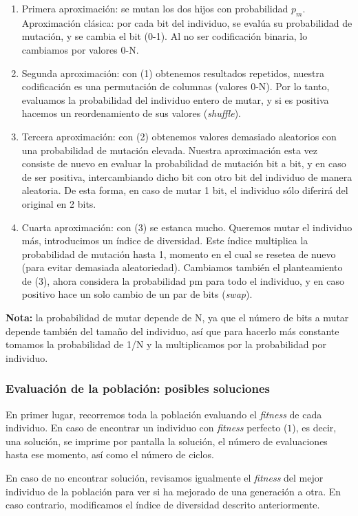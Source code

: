 \documentclass[12pt]{article}
\begin{document}
\begin{enumerate}
    \item Primera aproximación: se mutan los dos hijos con probabilidad $p_m$. Aproximación clásica: por cada bit del individuo, se evalúa su probabilidad de mutación, y se cambia el bit (0-1). Al no ser codificación binaria, lo cambiamos por valores 0-N.
    \item Segunda aproximación: con (1) obtenemos resultados repetidos, nuestra codificación es una permutación de columnas (valores 0-N). Por lo tanto, evaluamos la probabilidad del individuo entero de mutar, y si es positiva hacemos un reordenamiento de sus valores (\emph{shuffle}).
    \item Tercera aproximación: con (2) obtenemos valores demasiado aleatorios con una probabilidad de mutación elevada. Nuestra aproximación esta vez consiste de nuevo en evaluar la probabilidad de mutación bit a bit, y en caso de ser positiva, intercambiando dicho bit con otro bit del individuo de manera aleatoria. De esta forma, en caso de mutar 1 bit, el individuo sólo diferirá del original en 2 bits.
    \item Cuarta aproximación: con (3) se estanca mucho. Queremos mutar el individuo más, introducimos un índice de diversidad. Este índice multiplica la probabilidad de mutación hasta 1, momento en el cual se resetea de nuevo (para evitar demasiada aleatoriedad). Cambiamos también el planteamiento de (3), ahora considera la probabilidad pm para todo el individuo, y en caso positivo hace un solo cambio de un par de bits (\emph{swap}).
    
\end{enumerate}
\textbf{Nota:}
la probabilidad de mutar depende de N, ya que el número de bits a mutar depende también del tamaño del individuo, así que para hacerlo más constante tomamos la probabilidad de 1/N y la multiplicamos por la probabilidad por individuo.


\subsubsection{Evaluación de la población: posibles soluciones}
En primer lugar, recorremos toda la población evaluando el \emph{fitness} de cada individuo. En caso de encontrar un individuo con \emph{fitness} perfecto ($1$), es decir, una solución, se imprime por pantalla la solución, el número de evaluaciones hasta ese momento, así como el número de ciclos.

En caso de no encontrar solución, revisamos igualmente el \emph{fitness} del mejor individuo de la población para ver si ha mejorado de una generación a otra. En caso contrario, modificamos el índice de diversidad descrito anteriormente.
\end{document}
